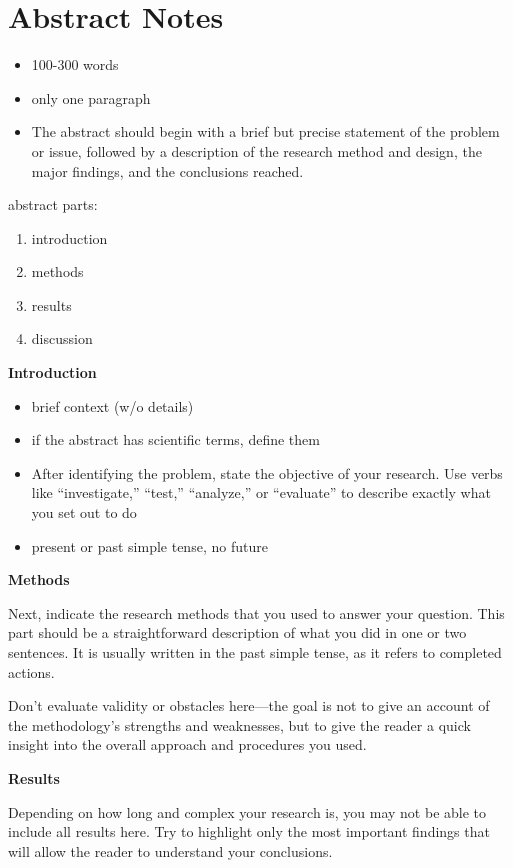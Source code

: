 \section*{Abstract Notes}

\begin{itemize}
    \item 100-300 words
    \item only one paragraph
    \item The abstract should begin with a brief but precise statement of the problem or issue, followed by a description of the research method and design, the major findings, and the conclusions reached.
\end{itemize}

abstract parts:

\begin{enumerate}
    \item introduction
    \item methods
    \item results
    \item discussion
\end{enumerate}

\textbf{Introduction}

\begin{itemize}
    \item brief context (w/o details)
    \item if the abstract has scientific terms, define them
    \item After identifying the problem, state the objective of your research. Use verbs like “investigate,” “test,” “analyze,” or “evaluate” to describe exactly what you set out to do
    \item present or past simple tense, no future
\end{itemize}

\textbf{Methods}

Next, indicate the research methods that you used to answer your question. This part should be a straightforward description of what you did in one or two sentences. It is usually written in the past simple tense, as it refers to completed actions.

Don't evaluate validity or obstacles here—the goal is not to give an account of the methodology's strengths and weaknesses, but to give the reader a quick insight into the overall approach and procedures you used.

\textbf{Results}

Depending on how long and complex your research is, you may not be able to include all results here. Try to highlight only the most important findings that will allow the reader to understand your conclusions.

